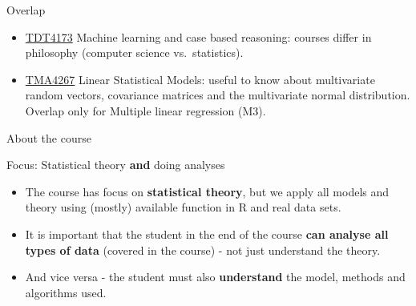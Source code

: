 \documentclass[10pt,ignorenonframetext,]{beamer}
\begin{document}
\begin{frame}

\begin{block}{Overlap}

\vspace{2mm}

\begin{itemize}
\item
  \href{https://www.ntnu.no/studier/emner/TDT4173\#tab=omEmnet}{TDT4173}
  Machine learning and case based reasoning: courses differ in
  philosophy (computer science vs.~statistics).
\item
  \href{https://www.ntnu.no/studier/emner/TMA4267\#tab=omEmnet}{TMA4267}
  Linear Statistical Models: useful to know about multivariate random
  vectors, covariance matrices and the multivariate normal distribution.
  Overlap only for Multiple linear regression (M3).
\end{itemize}

\end{block}

\end{frame}

\begin{frame}{About the course}

\begin{block}{Focus: Statistical theory \textbf{and} doing analyses}

\begin{itemize}
\item
  The course has focus on \textbf{statistical theory}, but we apply all
  models and theory using (mostly) available function in R and real data
  sets.
\item
  It is important that the student in the end of the course \textbf{can
  analyse all types of data} (covered in the course) - not just
  understand the theory.
\item
  And vice versa - the student must also \textbf{understand} the model,
  methods and algorithms used.
\end{itemize}

\end{block}

\end{frame}
\end{document}

